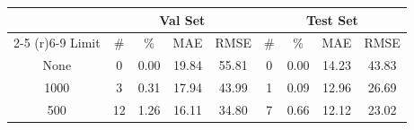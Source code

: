 \setlength\tabcolsep{0.5em}
\begin{tabular}{ccccccccc}
 \toprule
 &\multicolumn{4}{c}{Val Set} & \multicolumn{4}{c}{Test Set}   \\
  \cmidrule(r){2-5} \cmidrule(r){6-9} 
 Limit & \# & \% & MAE & RMSE  & \# & \% & MAE & RMSE\\
\midrule
None & 0 & 0.00 &19.84  & 55.81 & 0 & 0.00 & 14.23  & 43.83\\
1000 & 3 & 0.31 & 17.94 & 43.99 &  1 & 0.09 & 12.96 & 26.69\\
500 & 12 & 1.26 & 16.11 & 34.80 & 7 & 0.66 & 12.12 & 23.02\\
\bottomrule
\end{tabular}
